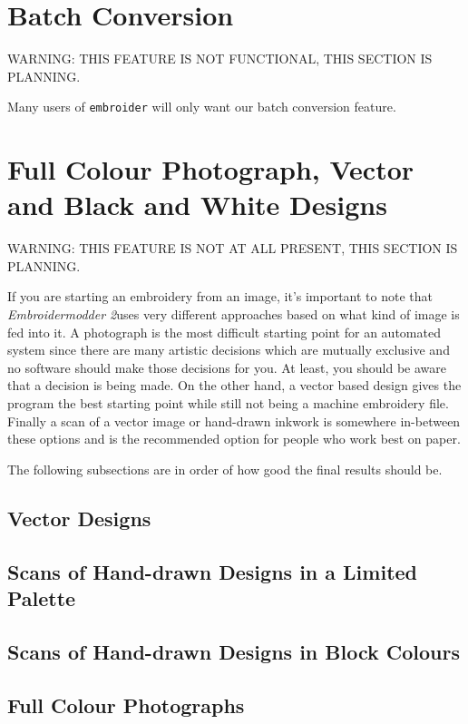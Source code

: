 \documentclass[a4paper,11pt]{article}
\newcommand{\embname}{\emph{Embroidermodder 2}}
\begin{document}
\section{Batch Conversion}

WARNING: THIS FEATURE IS NOT FUNCTIONAL, THIS SECTION IS PLANNING.

Many users of \texttt{embroider} will only want our batch conversion feature.

\section{Full Colour Photograph, Vector and Black and White Designs}

WARNING: THIS FEATURE IS NOT AT ALL PRESENT, THIS SECTION IS PLANNING.

If you are starting an embroidery from an image, it's important to note that \embname uses very different
approaches based on what kind of image is fed into it. A photograph is the most difficult starting point
for an automated system since there are many artistic decisions which are mutually exclusive and
no software should make those decisions for you. At least, you should be aware that a decision is being made.
On the other hand, a vector based design gives the program the best starting point while still not being
a machine embroidery file. Finally a scan of a vector image or hand-drawn inkwork is somewhere in-between
these options and is the recommended option for people who work best on paper.

The following subsections are in order of how good the final results should be.

\subsection{Vector Designs}


\subsection{Scans of Hand-drawn Designs in a Limited Palette}


\subsection{Scans of Hand-drawn Designs in Block Colours}


\subsection{Full Colour Photographs}
\end{document}

